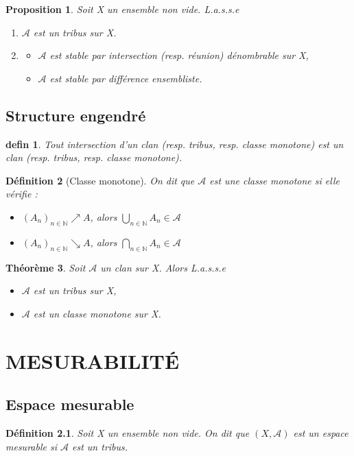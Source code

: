 \documentclass[a4paper,12pt,french]{report}
\theoremstyle{break}
\newtheorem{defin}{Définition}[section]
\newtheorem{theo}[defin]{Théorème}
\newtheorem{prop}[defin]{Proposition}
\newtheorem{lemme}{defin}{Lemme}
\begin{document}
\begin{prop}
        Soit X un ensemble non vide. L.a.s.s.e
        \begin{enumerate}
                \item $\mathcal{A}$ est un tribus sur X.
                \item
                        \begin{itemize}
                                \item[i)] $\mathcal{A}$ est stable par intersection (resp. réunion) dénombrable sur X,
                                \item[ii)] $\mathcal{A}$ est stable par différence ensembliste.
                        \end{itemize}
        \end{enumerate}
\end{prop}

\section{Structure engendré}
\begin{lemme}
         Tout intersection d'un clan (resp. tribus, resp. classe monotone) est un clan (resp. tribus, resp. classe monotone).
\end{lemme}

\begin{defin}[Classe monotone]
       On dit que $\mathcal{A}$ est une classe monotone si elle vérifie : 
       \begin{itemize}
              \item $(A_{n})_{n \in \mathbb{N}} \nearrow A$, alors $\displaystyle\bigcup_{n \in \mathbb{N}} A_{n} \in \mathcal{A}$
              \item $(A_{n})_{n \in \mathbb{N}} \searrow A$, alors $\displaystyle\bigcap_{n \in \mathbb{N}} A_{n} \in \mathcal{A}$
       \end{itemize}
\end{defin}

\begin{theo}
	Soit $\mathcal{A}$ un clan sur X. Alors L.a.s.s.e
	\begin{itemize}
		\item[i)] $\mathcal{A}$ est un tribus sur X,
		\item[ii)] $\mathcal{A}$ est un classe monotone sur X.
	\end{itemize}
\end{theo}

\chapter{MESURABILITÉ}
\section{Espace mesurable}
\begin{defin}
       Soit X un ensemble non vide. On dit que $(X,\mathcal{A})$ est un espace mesurable si $\mathcal{A}$ est un tribus.
\end{defin}
\end{document}
